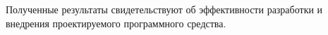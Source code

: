 





Полученные результаты свидетельствуют об эффективности разработки и внедрения проектируемого программного средства.